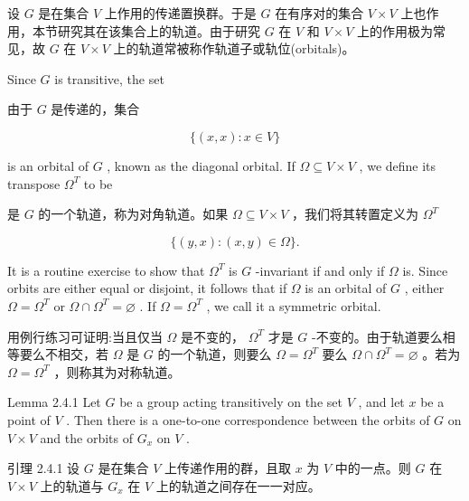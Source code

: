 \documentclass[10pt]{article}
\begin{document}
\begin{tcolorbox}\relax
设 \(G\) 是在集合 \(V\) 上作用的传递置换群。于是 \(G\) 在有序对的集合 \(V \times  V\) 上也作用，本节研究其在该集合上的轨道。由于研究 \(G\) 在 \(V\) 和 \(V \times  V\) 上的作用极为常见，故 \(G\) 在 \(V \times  V\) 上的轨道常被称作轨道子或轨位(orbitals)。
\end{tcolorbox}

Since \(G\) is transitive, the set

\begin{tcolorbox}\relax
由于 \(G\) 是传递的，集合
\end{tcolorbox}

\[
\{ \left( {x,x}\right)  : x \in  V\}
\]

is an orbital of \(G\) , known as the diagonal orbital. If \(\Omega  \subseteq  V \times  V\) , we define its transpose \({\Omega }^{T}\) to be

\begin{tcolorbox}\relax
是 \(G\) 的一个轨道，称为对角轨道。如果 \(\Omega  \subseteq  V \times  V\) ，我们将其转置定义为 \({\Omega }^{T}\)
\end{tcolorbox}

\[
\{ \left( {y,x}\right)  : \left( {x,y}\right)  \in  \Omega \} .
\]

It is a routine exercise to show that \({\Omega }^{T}\) is \(G\) -invariant if and only if \(\Omega\) is. Since orbits are either equal or disjoint, it follows that if \(\Omega\) is an orbital of \(G\) , either \(\Omega  = {\Omega }^{T}\) or \(\Omega  \cap  {\Omega }^{T} = \varnothing\) . If \(\Omega  = {\Omega }^{T}\) , we call it a symmetric orbital.

\begin{tcolorbox}\relax
用例行练习可证明:当且仅当 \(\Omega\) 是不变的， \({\Omega }^{T}\) 才是 \(G\) -不变的。由于轨道要么相等要么不相交，若 \(\Omega\) 是 \(G\) 的一个轨道，则要么 \(\Omega  = {\Omega }^{T}\) 要么 \(\Omega  \cap  {\Omega }^{T} = \varnothing\) 。若为 \(\Omega  = {\Omega }^{T}\) ，则称其为对称轨道。
\end{tcolorbox}

Lemma 2.4.1 Let \(G\) be a group acting transitively on the set \(V\) , and let \(x\) be a point of \(V\) . Then there is a one-to-one correspondence between the orbits of \(G\) on \(V \times  V\) and the orbits of \({G}_{x}\) on \(V\) .

\begin{tcolorbox}\relax
引理 2.4.1 设 \(G\) 是在集合 \(V\) 上传递作用的群，且取 \(x\) 为 \(V\) 中的一点。则 \(G\) 在 \(V \times  V\) 上的轨道与 \({G}_{x}\) 在 \(V\) 上的轨道之间存在一一对应。
\end{tcolorbox}
\end{document}
